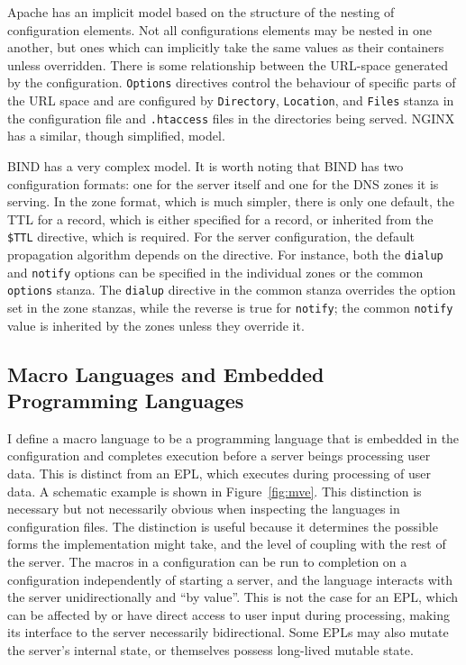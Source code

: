 \documentclass[letterpaper,twocolumn,10pt]{article}
\begin{document}
Apache has an implicit model based on the structure of the nesting of configuration elements. Not all configurations elements may be nested in one another, but ones which can implicitly take the same values as their containers unless overridden. There is some relationship between the URL-space generated by the configuration. \texttt{Options} directives control the behaviour of specific parts of the URL space and are configured by \texttt{Directory}, \texttt{Location}, and \texttt{Files} stanza in the configuration file and \verb!.htaccess! files in the directories being served.\cite{apache} NGINX has a similar, though simplified, model.\cite{nginx}

BIND has a very complex model. It is worth noting that BIND has two configuration formats: one for the server itself and one for the DNS zones it is serving. In the zone format, which is much simpler, there is only one default, the TTL for a record, which is either specified for a record, or inherited from the \texttt{\$TTL} directive, which is required. For the server configuration, the default propagation algorithm depends on the directive. For instance, both the \texttt{dialup}  and \texttt{notify} options can be specified in the individual zones or the common \texttt{options} stanza. The \texttt{dialup} directive in the common stanza overrides the option set in the zone stanzas, while the reverse is true for \texttt{notify}; the common \texttt{notify} value is inherited by the zones unless they override it.\cite{bind}

\subsection{Macro Languages and Embedded Programming Languages}
I define a macro language to be a programming language that is embedded in the configuration and completes execution before a server beings processing user data. This is distinct from an EPL, which executes during processing of user data. A schematic example is shown in Figure~\ref{fig:mve}. This distinction is necessary but not necessarily obvious when inspecting the languages in configuration files. The distinction is useful because it determines the possible forms the implementation might take, and the level of coupling with the rest of the server. The macros in a configuration can be run to completion on a configuration independently of starting a server, and the language interacts with the server unidirectionally and ``by value''. This is not the case for an EPL, which can be affected by or have direct access to user input during processing, making its interface to the server necessarily bidirectional. Some EPLs may also mutate the server's internal state, or themselves possess long-lived mutable state.
\end{document}
